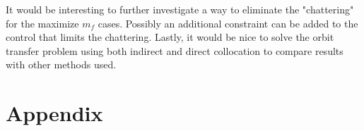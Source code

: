 \documentclass[]{article}
\begin{document}
	\vspace{2mm}\newline 
	It would be interesting to further investigate a way to eliminate the  "chattering" for the maximize \(m_f\) cases. Possibly an additional constraint can be added to the control that limits the chattering. Lastly, it would be nice to solve the orbit transfer problem using both indirect and direct collocation to compare results with other methods used.
	
	\section{Appendix}
	
	
	
	
	
	
    
\end{document}
